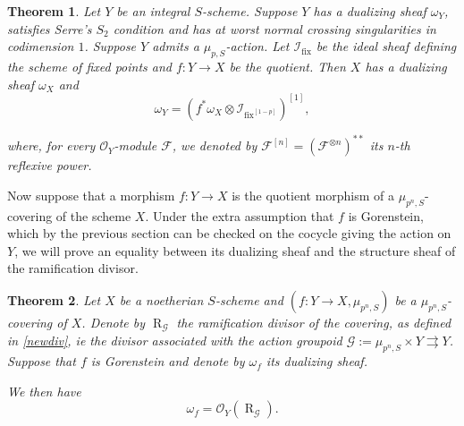 \documentclass{amsart}
\newtheorem{theo}{Theorem}[section]
\theoremstyle{definition}
\theoremstyle{remark}
\begin{document}
\begin{theo} \cite[Th 8.1]{Tziolas}
\label{Tzi}
Let $Y$ be an integral $S$-scheme. Suppose $Y$ has a dualizing sheaf $\omega_Y$, satisfies Serre's $S_2$ condition and has at worst normal crossing singularities in codimension $1$. Suppose $Y$ admits a $\mu_{p,S}$-action. Let ${{\mathcal I}}_\operatorname{fix}$ be the ideal sheaf defining the scheme of fixed points and $f : Y {\longrightarrow} X$ be the quotient. Then $X$ has a dualizing sheaf $\omega_X$ and \[ \omega_{Y} = ( f^* \omega_X \otimes {{\mathcal I}}_\operatorname{fix}^{[1-p]})^{[1]}, \]

where, for every ${{\mathcal O}}_Y$-module ${{\mathcal F}}$, we denoted by ${{\mathcal F}}^{[n]} = ({{\mathcal F}}^{\otimes n})^{**}$ its $n$-th reflexive power.  
\end{theo}

Now suppose that a morphism $f : Y {\longrightarrow} X$ is the quotient morphism of a $\mu_{p^n,S}$-covering of the scheme $X$. Under the extra assumption that $f$ is Gorenstein, which by the previous section can be checked on the cocycle giving the action on $Y$, we will prove an equality between its dualizing sheaf and the structure sheaf of the ramification divisor.  

\begin{theo}

Let $X$ be a noetherian $S$-scheme and $(f : Y {\longrightarrow} X, \mu_{p^n,S})$ be a $\mu_{p^n,S}$-covering of $X$. Denote by $\operatorname{R}_{{\mathcal G}}$ the ramification divisor of the covering, as defined in \ref{newdiv}, ie the divisor associated with the action groupoid ${{\mathcal G}}:=\mu_{p^n,S} \times Y {\rightrightarrows} Y$. Suppose that $f$ is Gorenstein and denote by $\omega_f$ its dualizing sheaf. 

We then have \[ \omega_f = {{\mathcal O}}_Y(\operatorname{R}_{{\mathcal G}}). \] 

\label{newRH}

\end{theo}
\end{document}
